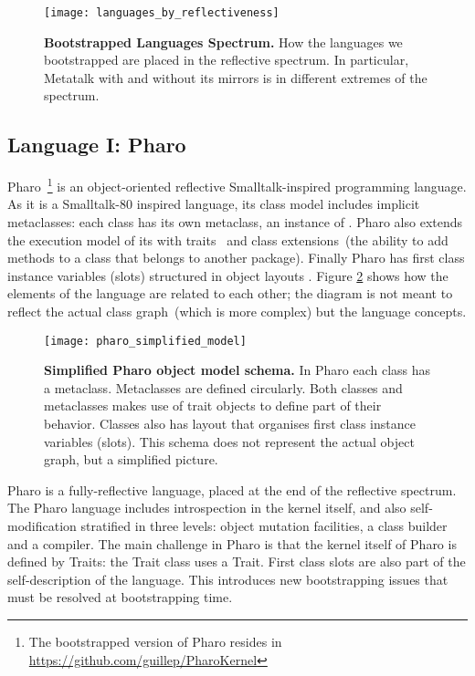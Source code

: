 \begin{figure}[ht]
\center
\texttt{[image: languages\_by\_reflectiveness]}
\caption{\textbf{Bootstrapped Languages Spectrum.} How the languages we bootstrapped are placed in the reflective spectrum. In particular, Metatalk with and without its mirrors is in different extremes of the spectrum.\label{fig:languages_spectrum}}
\end{figure}


\subsection{Language I: Pharo}\label{sec:bootstrap_pharo}

Pharo~\cite{Blac09a}\footnote{The bootstrapped version of Pharo resides in \url{https://github.com/guillep/PharoKernel}} is an object-oriented reflective Smalltalk-inspired programming language. As it is a Smalltalk-80 inspired language, its class model includes implicit metaclasses: each class has its own metaclass, an instance of . Pharo also extends the execution model of its \VM with traits~\cite{Scha03a} and class extensions~(\ie the ability to add methods to a class that belongs to another package). Finally Pharo has first class instance variables (slots) structured in object layouts \cite{Verw11a}. Figure \ref{fig:pharo_simplified_model} shows how the elements of the language are related to each other; the diagram is not meant to reflect the actual class graph~(which is more complex) but the language concepts.

\begin{figure}[ht]
\center
\texttt{[image: pharo\_simplified\_model]}
\caption{\textbf{Simplified Pharo object model schema.} In Pharo each class has a metaclass. Metaclasses are defined circularly. Both classes and metaclasses makes use of trait objects to define part of their behavior. Classes also has layout that organises first class instance variables (slots). This schema does not represent the actual object graph, but a simplified picture.\label{fig:pharo_simplified_model}}
\end{figure}

Pharo is a fully-reflective language, placed at the end of the reflective spectrum. The Pharo language includes introspection in the kernel itself, and also self-modification stratified in three levels: object mutation facilities, a class builder and a compiler. The main challenge in Pharo is that the kernel itself of Pharo is defined by Traits: \eg the Trait class uses a Trait. First class slots are also part of the self-description of the language. This introduces new bootstrapping issues that must be resolved at bootstrapping time.


